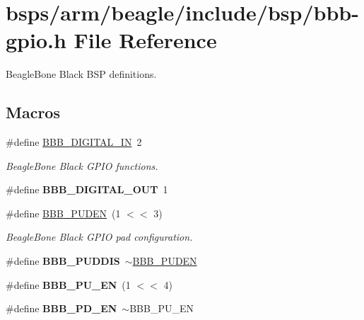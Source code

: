 \hypertarget{bbb-gpio_8h}{}\section{bsps/arm/beagle/include/bsp/bbb-\/gpio.h File Reference}
\label{bbb-gpio_8h}


Beagle\+Bone Black B\+SP definitions.  


\subsection*{Macros}
\begin{DoxyCompactItemize}
\item 
\#define \mbox{\hyperlink{bbb-gpio_8h_a34bb5dfdb5fa11fa1320dd657aeaa562}{B\+B\+B\+\_\+\+D\+I\+G\+I\+T\+A\+L\+\_\+\+IN}}~2
\begin{DoxyCompactList}\small\item\em Beagle\+Bone Black G\+P\+IO functions. \end{DoxyCompactList}\item 
\mbox{\label{bbb-gpio_8h_af5c26561aecb40a3a641710d23032cc9}} 
\#define {\bfseries B\+B\+B\+\_\+\+D\+I\+G\+I\+T\+A\+L\+\_\+\+O\+UT}~1
\item 
\mbox{\label{bbb-gpio_8h_abcb6d1204ec584d6e320de0f7e344bc2}} 
\#define \mbox{\hyperlink{bbb-gpio_8h_abcb6d1204ec584d6e320de0f7e344bc2}{B\+B\+B\+\_\+\+P\+U\+D\+EN}}~(1 $<$$<$ 3)
\begin{DoxyCompactList}\small\item\em Beagle\+Bone Black G\+P\+IO pad configuration. \end{DoxyCompactList}\item 
\mbox{\label{bbb-gpio_8h_abed02b6d3713d5b58e4e5110f45ba40b}} 
\#define {\bfseries B\+B\+B\+\_\+\+P\+U\+D\+D\+IS}~$\sim$\mbox{\hyperlink{bbb-gpio_8h_abcb6d1204ec584d6e320de0f7e344bc2}{B\+B\+B\+\_\+\+P\+U\+D\+EN}}
\item 
\mbox{\label{bbb-gpio_8h_af01d7209c69f25772696a2c08062e18d}} 
\#define {\bfseries B\+B\+B\+\_\+\+P\+U\+\_\+\+EN}~(1 $<$$<$ 4)
\item 
\mbox{\label{bbb-gpio_8h_ace3b1543d30c3d1e2ed273984c776f45}} 
\#define {\bfseries B\+B\+B\+\_\+\+P\+D\+\_\+\+EN}~$\sim$B\+B\+B\+\_\+\+P\+U\+\_\+\+EN

\end{DoxyCompactItemize}
